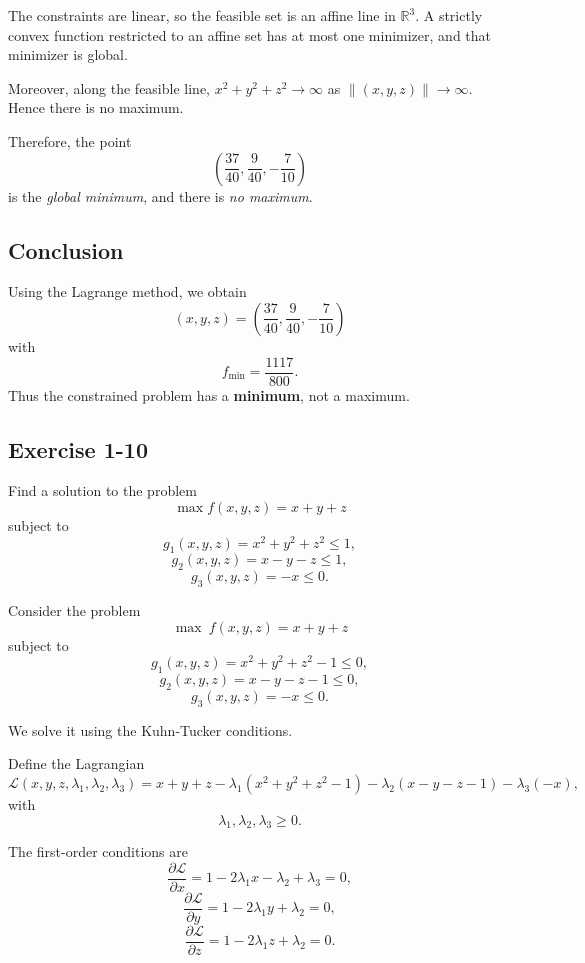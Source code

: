 The constraints are linear, so the feasible set is an affine line in \(\mathbb{R}^3\). A strictly convex function restricted to an affine set has at most one minimizer, and that minimizer is global.

Moreover, along the feasible line, \(x^2+y^2+z^2\to \infty\) as \(\|(x,y,z)\|\to\infty\). Hence there is no maximum.

Therefore, the point
\[
\boxed{
\left(\frac{37}{40},\frac{9}{40},-\frac{7}{10}\right)
}
\]
is the \emph{global minimum}, and there is \emph{no maximum}.

\subsection*{Conclusion}

Using the Lagrange method, we obtain
\[
\boxed{
\left(x,y,z\right)=\left(\frac{37}{40},\frac{9}{40},-\frac{7}{10}\right)
}
\]
with
\[
\boxed{
f_{\min}=\frac{1117}{800}.
}
\]
Thus the constrained problem has a \textbf{minimum}, not a maximum.



\vspace{30pt}
\begin{tcolorbox}[breakable]

\subsection*{Exercise 1-10}

Find a solution to the problem
\[
\max f(x,y,z)=x+y+z
\]
subject to
\[
g_1(x,y,z)=x^2+y^2+z^2 \le 1,
\]
\[
g_2(x,y,z)=x-y-z \le 1,
\]
\[
g_3(x,y,z)=-x \le 0.
\]

\end{tcolorbox}


Consider the problem
\[
\max \ f(x,y,z)=x+y+z
\]
subject to
\[
g_1(x,y,z)=x^2+y^2+z^2-1\le 0,
\]
\[
g_2(x,y,z)=x-y-z-1\le 0,
\]
\[
g_3(x,y,z)=-x\le 0.
\]

We solve it using the Kuhn-Tucker conditions.

Define the Lagrangian
\[
\mathcal{L}(x,y,z,\lambda_1,\lambda_2,\lambda_3)
=
x+y+z
-\lambda_1(x^2+y^2+z^2-1)
-\lambda_2(x-y-z-1)
-\lambda_3(-x),
\]
with
\[
\lambda_1,\lambda_2,\lambda_3\ge 0.
\]

The first-order conditions are
\[
\frac{\partial \mathcal{L}}{\partial x}
=
1-2\lambda_1 x-\lambda_2+\lambda_3=0, \tag{1}
\]
\[
\frac{\partial \mathcal{L}}{\partial y}
=
1-2\lambda_1 y+\lambda_2=0, \tag{2}
\]
\[
\frac{\partial \mathcal{L}}{\partial z}
=
1-2\lambda_1 z+\lambda_2=0. \tag{3}
\]

